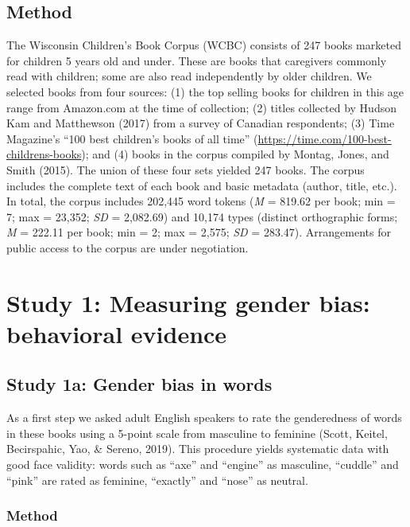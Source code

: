 \documentclass[
  english,
  ,man,floatsintext]{apa6}
\begin{document}
\hypertarget{method}{%
\subsection{Method}\label{method}}

The Wisconsin Children's Book Corpus (WCBC) consists of 247 books marketed for children 5 years old and under. These are books that caregivers commonly read with children; some are also read independently by older children. We selected books from four sources: (1) the top selling books for children in this age range from Amazon.com at the time of collection; (2) titles collected by Hudson Kam and Matthewson (2017) from a survey of Canadian respondents; (3) Time Magazine's \enquote{100 best children's books of all time} (\url{https://time.com/100-best-childrens-books}); and (4) books in the corpus compiled by Montag, Jones, and Smith (2015). The union of these four sets yielded 247 books. The corpus includes the complete text of each book and basic metadata (author, title, etc.). In total, the corpus includes 202,445 word tokens (\emph{M} = 819.62 per book; min = 7; max = 23,352; \emph{SD} = 2,082.69) and 10,174 types (distinct orthographic forms; \emph{M} = 222.11 per book; min = 2; max = 2,575; \emph{SD} = 283.47). Arrangements for public access to the corpus are under negotiation.

\hypertarget{study-1-measuring-gender-bias-behavioral-evidence}{%
\section{Study 1: Measuring gender bias: behavioral evidence}\label{study-1-measuring-gender-bias-behavioral-evidence}}

\hypertarget{study-1a-gender-bias-in-words}{%
\subsection{Study 1a: Gender bias in words}\label{study-1a-gender-bias-in-words}}

As a first step we asked adult English speakers to rate the genderedness of words in these books using a 5-point scale from masculine to feminine (Scott, Keitel, Becirspahic, Yao, \& Sereno, 2019). This procedure yields systematic data with good face validity: words such as \enquote{axe} and \enquote{engine} as masculine, \enquote{cuddle} and \enquote{pink} are rated as feminine, \enquote{exactly} and \enquote{nose} as neutral.

\hypertarget{method-1}{%
\subsubsection{Method}\label{method-1}}
\end{document}
